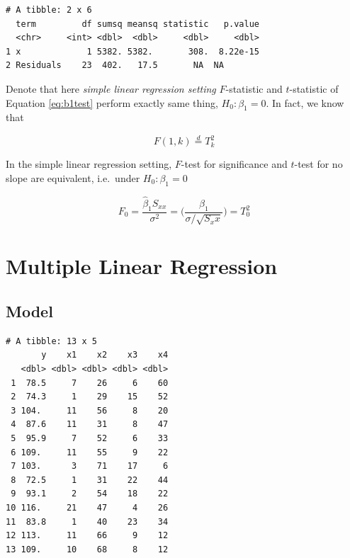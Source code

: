 \documentclass[]{book}
\newenvironment{Shaded}{\begin{snugshade}}{\end{snugshade}}
\newcommand{\KeywordTok}[1]{\textcolor[rgb]{0.13,0.29,0.53}{\textbf{#1}}}
\newcommand{\NormalTok}[1]{#1}
\newcommand{\OperatorTok}[1]{\textcolor[rgb]{0.81,0.36,0.00}{\textbf{#1}}}
\newcommand{\StringTok}[1]{\textcolor[rgb]{0.31,0.60,0.02}{#1}}
\theoremstyle{definition}
\theoremstyle{definition}
\theoremstyle{definition}
\theoremstyle{remark}
\let\BeginKnitrBlock\begin \let\EndKnitrBlock\end
\begin{document}
\begin{verbatim}
# A tibble: 2 x 6
  term         df sumsq meansq statistic   p.value
  <chr>     <int> <dbl>  <dbl>     <dbl>     <dbl>
1 x             1 5382. 5382.       308.  8.22e-15
2 Residuals    23  402.   17.5       NA  NA       
\end{verbatim}

Denote that here \emph{simple linear regression setting} \(F\)-statistic and \(t\)-statistic of Equation \eqref{eq:b1test} perform exactly same thing, \(H_0 : \beta_1 = 0\). In fact, we know that

\[F(1, k) \stackrel{d}{=} T_k^2\]

\BeginKnitrBlock{remark}
{}In the simple linear regression setting, \(F\)-test for significance and \(t\)-test for no slope are equivalent, i.e.~under \(H_0 : \beta_1 = 0\)

\[F_0 = \frac{\hat\beta_1 S_{xx}}{\sigma^2} = \bigg( \frac{\hat\beta_1}{\sigma / \sqrt{S_xx}} \bigg) = T_0^2\]
\EndKnitrBlock{remark}

\hypertarget{multiple}{%
\chapter{Multiple Linear Regression}\label{multiple}}

\hypertarget{model-1}{%
\section{Model}\label{model-1}}

\begin{Shaded}
\end{Shaded}

\begin{verbatim}
# A tibble: 13 x 5
       y    x1    x2    x3    x4
   <dbl> <dbl> <dbl> <dbl> <dbl>
 1  78.5     7    26     6    60
 2  74.3     1    29    15    52
 3 104.     11    56     8    20
 4  87.6    11    31     8    47
 5  95.9     7    52     6    33
 6 109.     11    55     9    22
 7 103.      3    71    17     6
 8  72.5     1    31    22    44
 9  93.1     2    54    18    22
10 116.     21    47     4    26
11  83.8     1    40    23    34
12 113.     11    66     9    12
13 109.     10    68     8    12
\end{verbatim}
\end{document}
